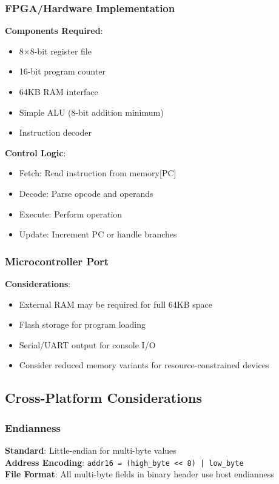 \documentclass[a4paper,12pt]{article}
\begin{document}
\subsubsection{FPGA/Hardware Implementation}
\textbf{Components Required}:
\begin{itemize}
    \item 8×8-bit register file
    \item 16-bit program counter
    \item 64KB RAM interface
    \item Simple ALU (8-bit addition minimum)
    \item Instruction decoder
\end{itemize}

\textbf{Control Logic}:
\begin{itemize}
    \item Fetch: Read instruction from memory[PC]
    \item Decode: Parse opcode and operands
    \item Execute: Perform operation
    \item Update: Increment PC or handle branches
\end{itemize}

\subsubsection{Microcontroller Port}
\textbf{Considerations}:
\begin{itemize}
    \item External RAM may be required for full 64KB space
    \item Flash storage for program loading
    \item Serial/UART output for console I/O
    \item Consider reduced memory variants for resource-constrained devices
\end{itemize}

\subsection{Cross-Platform Considerations}

\subsubsection{Endianness}
\textbf{Standard}: Little-endian for multi-byte values\\
\textbf{Address Encoding}: \texttt{addr16 = (high\_byte << 8) | low\_byte}\\
\textbf{File Format}: All multi-byte fields in binary header use host endianness
\end{document}
